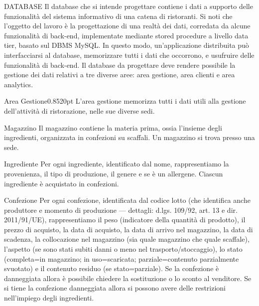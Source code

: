 \begin{center}
\begin{reqtable}{DATABASE}
Il database che si intende progettare contiene i dati a supporto delle funzionalità
del sistema informativo di una catena di ristoranti. Si noti che l’oggetto
del lavoro è la progettazione di una realtà dei dati, corredata da alcune funzionalità
di back-end, implementate mediante stored procedure a livello data tier,
basato sul DBMS MySQL. In questo modo, un’applicazione distribuita può interfacciarsi
 al database, memorizzare tutti i dati che occorrono, e usufruire delle funzionalità di back-end.
Il database da progettare deve rendere possibile la gestione dei dati relativi
a tre diverse aree: area gestione, area clienti e area analytics.
\end{reqtable}
\begin{reqtable}{Area Gestione}{0.85}{20pt}
L'area gestione memorizza tutti i dati utili alla gestione dell'attività di
ristorazione, nelle sue diverse sedi.
\end{reqtable}
\begin{reqtable}{Magazzino}
Il magazzino contiene la materia prima, ossia l'insieme degli ingredienti,
organizzata in confezioni su scaffali. Un magazzino si trova presso una sede.
\end{reqtable}
\begin{reqtable}{Ingrediente}
Per ogni ingrediente, identificato dal nome, rappresentiamo la provenienza, il tipo di produzione,
il genere e se è un allergene. Ciascun ingrediente è acquistato in confezioni.
\end{reqtable}
\begin{reqtable}{Confezione}
Per ogni confezione, identificata dal codice lotto (che identifica anche produttore
e momento di produzione --- dettagli: \mbox{d.lgs.} \mbox{109/92}, art. 13 e dir. \mbox{2011/91/UE}),
rappresentiamo il peso (indicatore della quantità di prodotto), il prezzo di acquisto,
la data di acquisto, la data di arrivo nel magazzino, la data di scadenza, la
collocazione nel magazzino (sia quale magazzino che quale scaffale), l'aspetto
(se sono stati subiti danni o meno nel trasporto/stoccaggio),
lo stato (completa=in magazzino; in uso=scaricata; parziale=contenuto parzialmente svuotato)
e il contenuto residuo (se stato=parziale). Se la confezione è danneggiata allora è
possibile chiedere la sostituzione o lo sconto al venditore. Se si tiene la confezione
danneggiata allora si possono avere delle restrizioni nell'impiego degli ingredienti.
\end{reqtable}

\end{center}

